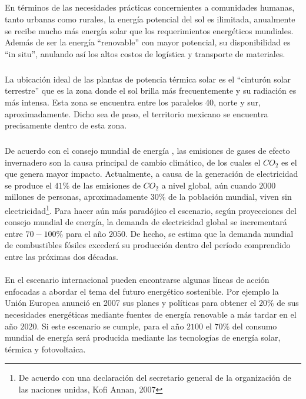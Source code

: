 \documentclass{article}
\theoremstyle{definition} \newtheorem{defi}{Definici\'on}
\theoremstyle{definition} \newtheorem{teo}{Teorema}
\theoremstyle{definition} \newtheorem{cor}{Corolario}
\begin{document}
\subparagraph{}
En t\'erminos de las necesidades pr\'acticas concernientes a comunidades humanas, tanto urbanas como rurales, la energ\'ia potencial del sol es ilimitada, anualmente se recibe mucho m\'as energ\'ia solar que los requerimientos energ\'eticos mundiales. Adem\'as de ser la energ\'ia ``renovable'' con mayor potencial, su disponibilidad es ``in situ'', anulando as\'i los altos costos de log\'istica y transporte de materiales.
\subparagraph{}
La ubicaci\'on ideal de las plantas de potencia t\'ermica solar es el ``cintur\'on solar terrestre'' que es la zona donde el sol brilla m\'as frecuentemente y su radiaci\'on es m\'as intensa. Esta zona se encuentra entre los paralelos 40, norte y sur, aproximadamente. Dicho sea de paso, el territorio mexicano se encuentra precisamente dentro de esta zona.
\subparagraph{}
De acuerdo con el consejo mundial de energ\'ia \cite{l2}, las emisiones de gases de efecto invernadero son la causa principal de cambio clim\'atico, de los cuales el $CO_2$ es el que genera mayor impacto. Actualmente, a causa de la generaci\'on de electricidad se produce el $41\%$ de las emisiones de $CO_2$ a nivel global, a\'un cuando $2000$ millones de personas, aproximadamente $30\%$ de la poblaci\'on mundial, viven sin electricidad\footnote{De acuerdo con una declaraci\'on del secretario general de la organizaci\'on de las naciones unidas, Kofi Annan, 2007}. Para hacer a\'un m\'as parad\'ojico el escenario, seg\'un proyecciones del consejo mundial de energ\'ia, la demanda de electricidad global se incrementar\'a entre $70-100\%$ para el a\~no $2050.$ De hecho, se estima que la demanda mundial de combustibles f\'osiles exceder\'a su producci\'on dentro del per\'iodo comprendido entre las pr\'oximas dos d\'ecadas.
\paragraph{}
En el escenario internacional pueden encontrarse algunas l\'ineas de acci\'on enfocadas a abordar el tema del futuro energ\'etico sostenible. Por ejemplo la Uni\'on Europea anunci\'o en 2007 sus planes y pol\'iticas para obtener el $20\%$ de sus necesidades energ\'eticas mediante fuentes de energ\'ia renovable a m\'as tardar en el a\~no $2020.$ Si este escenario se cumple, para el a\~no $2100$ el $70\%$ del consumo mundial de energ\'ia ser\'a producida mediante las tecnolog\'ias de energ\'ia solar, t\'ermica y fotovoltaica.
\end{document}
